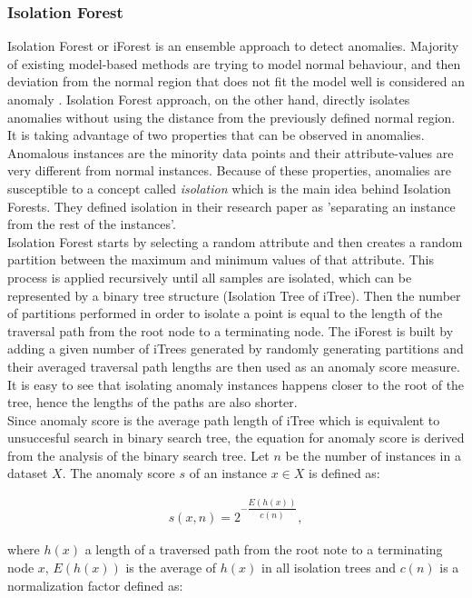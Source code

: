  \subsubsection{Isolation Forest}
 Isolation Forest or iForest \cite{liu2012isolation} is an ensemble approach to detect anomalies. Majority of existing model-based methods are trying to model normal behaviour, and then deviation from the normal region that does not fit the model well is considered an anomaly \cite{introToDataMining2005}. Isolation Forest approach, on the other hand, directly isolates anomalies without using the distance from the previously defined normal region. It is taking advantage of two properties that can be observed in anomalies. Anomalous instances are the minority data points and their attribute-values are very different from normal instances. Because of these properties, anomalies are susceptible to a concept called \textit{isolation} which is the main idea behind Isolation Forests. They defined isolation in their research paper as 'separating an instance from the rest of the instances'.\\
 Isolation Forest starts by selecting a random attribute and then creates a random partition between the maximum and minimum values of that attribute. This process is applied recursively until all samples are isolated, which can be represented by a binary tree structure (Isolation Tree of iTree). Then the number of partitions performed in order to isolate a point is equal to the length of the traversal path from the root node to a terminating node. The iForest is built by adding a given number of iTrees generated by randomly generating partitions and their averaged traversal path lengths are then used as an anomaly score measure. It is easy to see that isolating anomaly instances happens closer to the root of the tree, hence the lengths of the paths are also shorter. \\
 
 Since anomaly score is the average path length of iTree which is equivalent to unsuccesful search in binary search tree, the equation for anomaly score is derived from the analysis of the binary search tree.  Let $n$ be the number of instances in a dataset $X$. The anomaly score $s$ of an instance $x \in X$ is defined as: 
 
 \begin{gather}
     s(x, n) = 2^{- \dfrac{E(h(x))}{c(n)}},
 \end{gather}
 
 where $h(x)$ a length of a traversed path from the root note to a terminating node $x$, $E(h(x))$ is the average of $h(x)$ in all isolation trees and $c(n)$ is a normalization factor defined as: 
 
